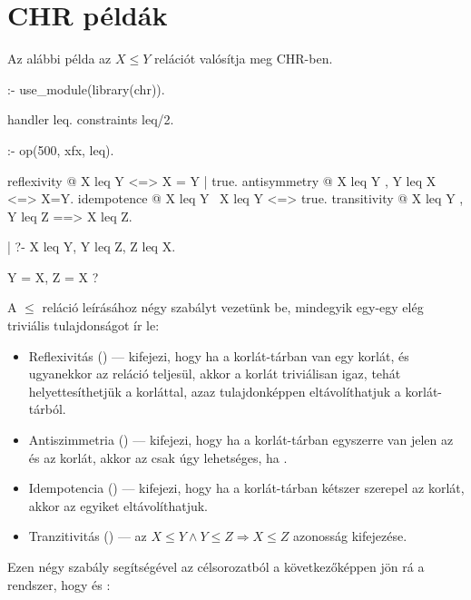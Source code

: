 \section{CHR példák}

Az alábbi példa az $X \leq Y$ relációt valósítja meg CHR-ben.
\begin{prologcode}
:- use_module(library(chr)).

handler leq.
constraints leq/2.

:- op(500, xfx, leq).

reflexivity  @ X leq Y <=> X = Y | true.
antisymmetry @ X leq Y , Y leq X <=> X=Y.
idempotence  @ X leq Y \ X leq Y <=> true.
transitivity @ X leq Y , Y leq Z ==> X leq Z.

| ?- X leq Y, Y leq Z, Z leq X.


Y = X, Z = X ? 
\end{prologcode}

A $\leq$ reláció leírásához négy szabályt vezetünk be, mindegyik egy-egy elég
triviális tulajdonságot ír le:

\begin{itemize}
\item Reflexivitás () --- kifejezi, hogy ha a korlát-tárban van
egy  korlát, és ugyanekkor az  reláció teljesül, akkor
a korlát triviálisan igaz, tehát helyettesíthetjük a  korláttal, azaz
tulajdonképpen eltávolíthatjuk a korlát-tárból.

\item Antiszimmetria () --- kifejezi, hogy ha a korlát-tárban
egyszerre van jelen az  és az  korlát, akkor az csak úgy
lehetséges, ha .

\item Idempotencia () --- kifejezi, hogy ha a korlát-tárban
kétszer szerepel az  korlát, akkor az egyiket eltávolíthatjuk.

\item Tranzitivitás () --- az
$X \leq Y \wedge Y \leq Z \Longrightarrow X \leq Z$ azonosság kifejezése.
\end{itemize}

Ezen négy szabály segítségével az  célsorozatból
a következőképpen jön rá a rendszer, hogy  és :

